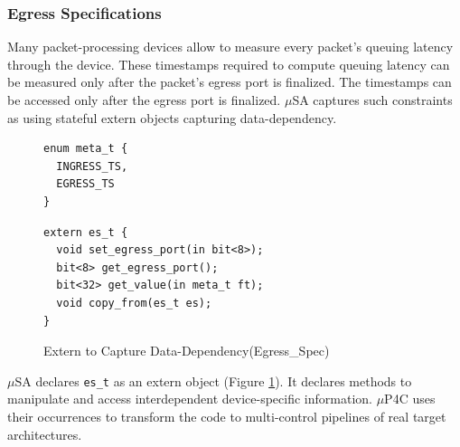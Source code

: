 \documentclass{hotnets19}
\begin{document}
\subsubsection{Egress Specifications}
Many packet-processing devices allow to measure every packet's queuing latency through the device.
These timestamps required to compute queuing latency can be measured only after the packet's egress port is finalized.
The timestamps can be accessed only after the egress port is finalized.
$\mu$SA captures such constraints as using stateful extern objects capturing data-dependency.
\begin{figure}
\begin{minipage}[c]{0.27\linewidth}
\begin{lstlisting}[frame=none]
enum meta_t {
  INGRESS_TS,
  EGRESS_TS
}
\end{lstlisting}
\end{minipage}\vline\hspace{3pt} 
\begin{minipage}[c]{0.68\linewidth}
\begin{lstlisting}[frame=none]
extern es_t {
  void set_egress_port(in bit<8>);
  bit<8> get_egress_port();
  bit<32> get_value(in meta_t ft);
  void copy_from(es_t es);
}
\end{lstlisting}
\end{minipage}
\caption{Extern to Capture Data-Dependency(Egress\_Spec)}
\label{fig:msa-egress-spec-extern}
\end{figure}
$\mu$SA declares \texttt{es\_t} as an extern object (Figure \ref{fig:msa-egress-spec-extern}).
It declares methods to manipulate and access interdependent device-specific information.
$\mu$P4C uses their occurrences to transform the code to multi-control pipelines of real target architectures.

\end{document}
